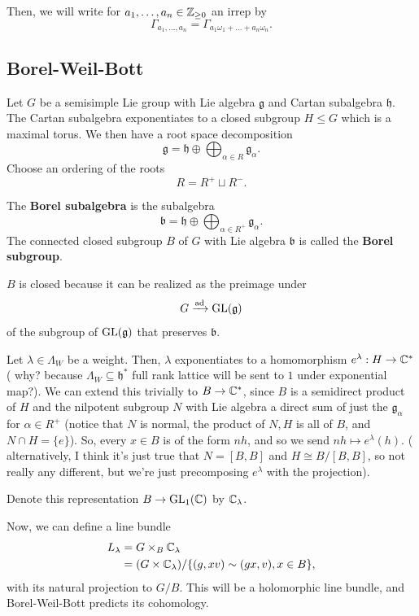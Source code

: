 \documentclass[12pt]{article}
\newcommand{\fg}{\mathfrak{g}}
\newcommand{\fh}{\mathfrak{h}}
\newcommand{\fb}{\mathfrak{b}}
\DeclareMathOperator{\ad}{ad}
\begin{document}
Then, we will write for $a_1,\dots,a_n\in \mathbb{Z}_{\geq 0}$ an irrep by
\[\Gamma_{a_1,\dots,a_n} = \Gamma_{a_1\omega_1+\dots+a_n\omega_n}.\]

\subsection{Borel-Weil-Bott}

Let $G$ be a semisimple Lie group with Lie algebra $\fg$ and Cartan subalgebra $\fh$. The Cartan subalgebra exponentiates to a closed subgroup $H\leq G$ which is a maximal torus. We then have a root space decomposition
\[\fg = \fh \oplus \bigoplus_{\alpha\in R} \fg_\alpha.\]
Choose an ordering of the roots
\[R = R^+ \sqcup R^-.\]

\begin{defn}
    The \textbf{Borel subalgebra} is the subalgebra
    \[\fb = \fh \oplus \bigoplus_{\alpha\in R^+} \fg_\alpha.\]
    The connected closed subgroup $B$ of $G$ with Lie algebra $\fb$ is called the \textbf{Borel subgroup}.
\end{defn}

\begin{rmk}
    $B$ is closed because it can be realized as the preimage under
    \[G \xrightarrow{\ad} \GL(\fg)\]
    of the subgroup of $\GL(\fg)$ that preserves $\fb$.
\end{rmk}


Let $\lambda\in \Lambda_W$ be a weight. Then, $\lambda$ exponentiates to a homomorphism $e^\lambda: H\to \mathbb{C}^*$ ({\color{red} why? because $\Lambda_W\subseteq \fh^*$ full rank lattice will be sent to $1$ under exponential map?}). We can extend this trivially to $B\to \mathbb{C}^*$, since $B$ is a semidirect product of $H$ and the nilpotent subgroup $N$ with Lie algebra a direct sum of just the $\fg_\alpha$ for $\alpha\in R^+$ (notice that $N$ is normal, the product of $N,H$ is all of $B$, and $N\cap H=\{e\}$). So, every $x\in B$ is of the form $nh$, and so we send $nh\mapsto e^{\lambda}(h)$. ({\color{red} alternatively, I think it's just true that $N=[B,B]$ and $H\cong B/[B,B]$, so not really any different, but we're just precomposing $e^\lambda$ with the projection}).

Denote this representation $B\to \mathrm{GL}_1(\mathbb{C})$ by $\mathbb{C}_\lambda$.

Now, we can define a line bundle
\begin{align*}
    L_\lambda &= G\times_B \mathbb{C}_\lambda\\
    &= (G\times \mathbb{C}_\lambda)/\{(g,xv) \sim (gx,v), x\in B\},
\end{align*}
with its natural projection to $G/B$. This will be a holomorphic line bundle, and Borel-Weil-Bott predicts its cohomology.
\end{document}
